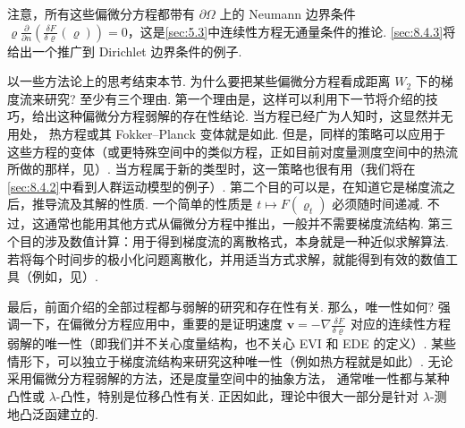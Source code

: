 注意，所有这些偏微分方程都带有 $\partial\Omega$ 上的 Neumann 边界条件 $\varrho\frac\partial{\partial n}(\frac{\delta F}{\delta\varrho}(\varrho))=0$，这是\autoref{sec:5.3}中连续性方程无通量条件的推论. \autoref{sec:8.4.3}将给出一个推广到 Dirichlet 边界条件的例子.

以一些方法论上的思考结束本节. 为什么要把某些偏微分方程看成距离 $W_2$ 下的梯度流来研究? 至少有三个理由. 第一个理由是，这样可以利用下一节将介绍的技巧，给出这种偏微分方程弱解的存在性结论. 当方程已经广为人知时，这显然并无用处，\label{idx:i75-p293}
热方程或其 Fokker--Planck 变体就是如此. 但是，同样的策略可以应用于这些方程的变体（或更特殊空间中的类似方程，正如目前对度量测度空间中的热流所做的那样，见\cite{b18,b183}）. 当方程属于新的类型时，这一策略也很有用（我们将在\autoref{sec:8.4.2}中看到人群运动模型的例子）. 第二个目的可以是，在知道它是梯度流之后，推导流及其解的性质. 一个简单的性质是 $t\mapsto F(\varrho_t)$ 必须随时间递减. 不过，这通常也能用其他方式从偏微分方程中推出，一般并不需要梯度流结构. 第三个目的涉及数值计算：用于得到梯度流的离散格式，本身就是一种近似求解算法. 若将每个时间步的极小化问题离散化，并用适当方式求解，就能得到有效的数值工具（例如，见\cite{b40}）.

最后，前面介绍的全部过程都与弱解的研究和存在性有关. 那么，唯一性如何? 强调一下，在偏微分方程应用中，重要的是证明速度 $\mathbf v=-\nabla\frac{\delta F}{\delta\varrho}$ 对应的连续性方程弱解的唯一性（即我们并不关心度量结构，也不关心 EVI 和 EDE 的定义）. 某些情形下，可以独立于梯度流结构来研究这种唯一性（例如热方程就是如此）. 无论采用偏微分方程弱解的方法，还是度量空间中的抽象方法，\label{idx:i6-p293}
通常唯一性都与某种凸性或 $\lambda$-凸性，特别是位移凸性有关. 正因如此，理论中很大一部分是针对 $\lambda$-测地凸泛函建立的.
